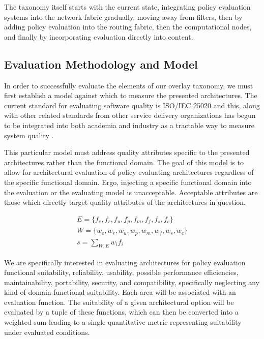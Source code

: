 The taxonomy itself starts with the current state, integrating policy evaluation systems into the network fabric gradually, moving away from filters, then by adding policy evaluation into the routing fabric, then the computational nodes, and finally by incorporating evaluation directly into content.

\subsection{Evaluation Methodology and Model}
In order to successfully evaluate the elements of our overlay taxonomy, we must first establish a model against which to measure the presented architectures.  The current standard for evaluating software quality is ISO/IEC 25020 and this, along with other related standards from other service delivery organizations has begun to be integrated into both academia and industry as a tractable way to measure system quality \cite{5958158, proposal:iso-25020}.

This particular model must address quality attributes specific to the presented architectures rather than the functional domain.  The goal of this model is to allow for architectural evaluation of policy evaluating architectures regardless of the specific functional domain.  Ergo, injecting a specific functional domain into the evaluation or the evaluating model is unacceptable.  Acceptable attributes are those which directly target quality attributes of the architectures in question.

\begin{eqnarray}
E = \lbrace f_{e}, f_{r}, f_{u}, f_{p}, f_{m}, f_{f}, f_{s}, f_{c} \rbrace \\
W= \lbrace w_{e}, w_{r}, w_{u}, w_{p}, w_{m}, w_{f}, w_{s}, w_{c} \rbrace \\
s = \sum_{W, E} w_{i} f_{i}
\end{eqnarray}

We are specifically interested in evaluating architectures for policy evaluation functional suitability, reliability, usability, possible performance efficiencies, maintainability, portability, security, and compatibility, specifically neglecting any kind of domain functional suitability.  Each area will be associated with an evaluation function.  The suitability of a given architectural option will be evaluated by a tuple of these functions, which can then be converted into a weighted sum leading to a single quantitative metric representing suitability under evaluated conditions.

